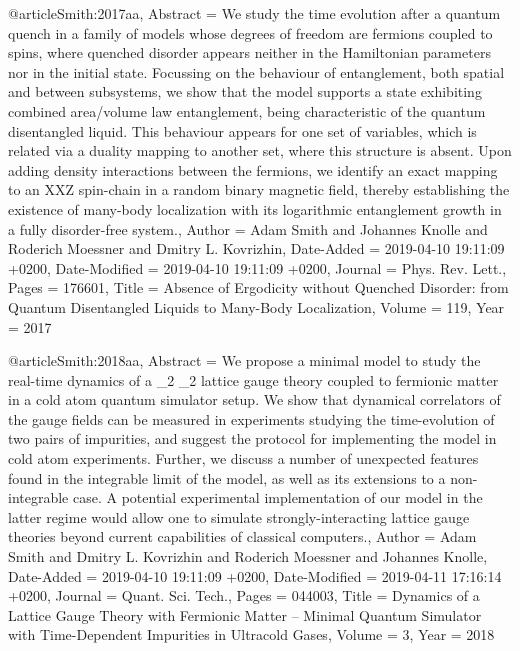 \documentclass[epj,final]{svjour}
\begin{document}
{@article{Smith:2017aa,
	Abstract = {We study the time evolution after a quantum quench in a family of models whose degrees of freedom are fermions coupled to spins, where quenched disorder appears neither in the Hamiltonian parameters nor in the initial state. Focussing on the behaviour of entanglement, both spatial and between subsystems, we show that the model supports a state exhibiting combined area/volume law entanglement, being characteristic of the quantum disentangled liquid. This behaviour appears for one set of variables, which is related via a duality mapping to another set, where this structure is absent. Upon adding density interactions between the fermions, we identify an exact mapping to an XXZ spin-chain in a random binary magnetic field, thereby establishing the existence of many-body localization with its logarithmic entanglement growth in a fully disorder-free system.},
	Author = {Adam Smith and Johannes Knolle and Roderich Moessner and Dmitry L. Kovrizhin},
	Date-Added = {2019-04-10 19:11:09 +0200},
	Date-Modified = {2019-04-10 19:11:09 +0200},
	Journal = {Phys. Rev. Lett.},
	Pages = {176601},
	Title = {Absence of Ergodicity without Quenched Disorder: from Quantum Disentangled Liquids to Many-Body Localization},
	Volume = {119},
	Year = {2017}}

@article{Smith:2018aa,
	Abstract = {We propose a minimal model to study the real-time dynamics of a _2 _2 lattice gauge theory coupled to fermionic matter in a cold atom quantum simulator setup. We show that dynamical correlators of the gauge fields can be measured in experiments studying the time-evolution of two pairs of impurities, and suggest the protocol for implementing the model in cold atom experiments. Further, we discuss a number of unexpected features found in the integrable limit of the model, as well as its extensions to a non-integrable case. A potential experimental implementation of our model in the latter regime would allow one to simulate strongly-interacting lattice gauge theories beyond current capabilities of classical computers.},
	Author = {Adam Smith and Dmitry L. Kovrizhin and Roderich Moessner and Johannes Knolle},
	Date-Added = {2019-04-10 19:11:09 +0200},
	Date-Modified = {2019-04-11 17:16:14 +0200},
	Journal = {Quant. Sci. Tech.},
	Pages = {044003},
	Title = {Dynamics of a Lattice Gauge Theory with Fermionic Matter -- Minimal Quantum Simulator with Time-Dependent Impurities in Ultracold Gases},
	Volume = {3},
	Year = {2018}}

}
\end{document}
